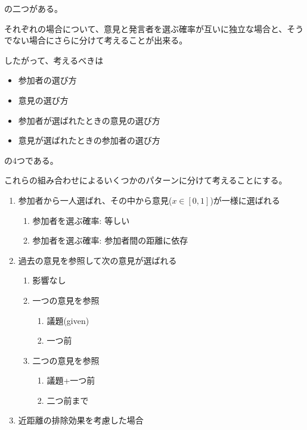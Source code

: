 \documentclass[letterpaper,10pt,english]{sphinxmanual}
\begin{document}
の二つがある。

それぞれの場合について、意見と発言者を選ぶ確率が互いに独立な場合と、そうでない場合にさらに分けて考えることが出来る。

したがって、考えるべきは
\begin{itemize}
\item {} 
参加者の選び方

\item {} 
意見の選び方

\item {} 
参加者が選ばれたときの意見の選び方

\item {} 
意見が選ばれたときの参加者の選び方

\end{itemize}

の4つである。

これらの組み合わせによるいくつかのパターンに分けて考えることにする。
\begin{enumerate}
\item {} 
参加者から一人選ばれ、その中から意見(\(x\in [0, 1]\))が一様に選ばれる
\begin{enumerate}
\item {} 
参加者を選ぶ確率: 等しい

\item {} 
参加者を選ぶ確率: 参加者間の距離に依存

\end{enumerate}

\item {} 
過去の意見を参照して次の意見が選ばれる
\begin{enumerate}
\item {} 
影響なし

\item {} 
一つの意見を参照
\begin{enumerate}
\item {} 
議題(given)

\item {} 
一つ前

\end{enumerate}

\item {} 
二つの意見を参照
\begin{enumerate}
\item {} 
議題+一つ前

\item {} 
二つ前まで

\end{enumerate}

\end{enumerate}

\item {} 
近距離の排除効果を考慮した場合

\end{enumerate}
\end{document}
